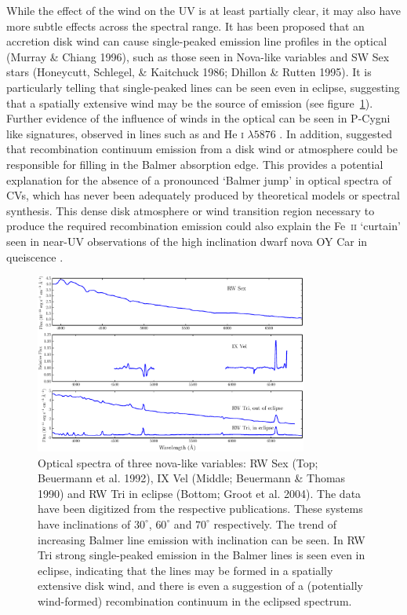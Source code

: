 \documentclass[preprint, a4paper, 11pt]{aastex}
\begin{document}
While the effect of the wind on the UV is at least partially clear, it may also have more subtle 
effects across the spectral range. It has been proposed that an accretion disk wind
can cause single-peaked emission line profiles in the optical (Murray \& Chiang 1996), 
such as those seen in Nova-like variables and SW Sex stars (Honeycutt, Schlegel,
\& Kaitchuck 1986; Dhillon \& Rutten 1995). It is particularly telling that single-peaked 
lines can be seen even in eclipse, suggesting 
that a spatially extensive wind may be the source of emission (see figure~\ref{novalikes}).
Further evidence of the influence of winds in the optical can be seen in P-Cygni like signatures,
observed in lines such as \ha and He \textsc{i} $\lambda5876$ \citep{RN98}.
In addition, \cite{KLWB98} suggested
that recombination continuum emission from a disk wind or atmosphere
could be responsible for filling in the Balmer absorption edge. This provides
a potential explanation for
the absence of a pronounced `Balmer jump' in optical spectra of CVs, which has never been adequately produced 
by theoretical models or spectral synthesis.
This dense disk atmosphere or wind transition region
necessary to produce the required recombination emission
could also explain the Fe~\textsc{ii} `curtain'
seen in near-UV observations of the high inclination dwarf nova OY Car in queiscence 
\citep{horne1994}.


\begin{figure}	%
\centering
\includegraphics[width=0.8\textwidth]{figures/fig1.eps}
\caption{Optical spectra of three nova-like variables: 
RW Sex (Top; Beuermann et al. 1992),
IX Vel (Middle; Beuermann \& Thomas 1990)
and RW Tri in eclipse (Bottom; Groot et al. 2004).
The data have been digitized from the respective publications. 
These systems have inclinations of $30^\circ$, $60^\circ$ and $70^\circ$ 
respectively.
The trend of increasing Balmer line emission with inclination can be seen.
In RW Tri strong single-peaked emission in the Balmer lines is seen even
in eclipse, indicating that the lines may be formed in a spatially extensive disk wind, and there is even a suggestion
of a (potentially wind-formed) recombination continuum in the eclipsed spectrum.}
\label{novalikes}
\end{figure}
\end{document}
